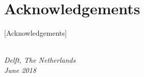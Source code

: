\chapter*{Acknowledgements}

[Acknowledgements]

\begin{flushright}
{\makeatletter\itshape
    \@author \\
    Delft, The Netherlands \\
    June 2018
\makeatother}
\end{flushright}
